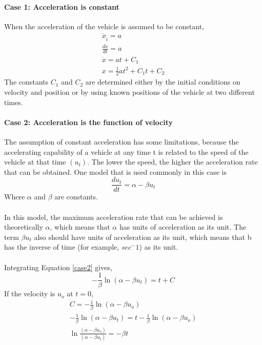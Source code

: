 \paragraph{Case 1: Acceleration is constant}
When the acceleration of the vehicle is assumed to be constant,
\begin{gather}
	\ddot{x}_{\hat{i}} = a\\
	\frac{d\dot{x}}{dt} = a\\
	\dot{x} = a t + C_1\\
	x =\frac{1}{2}a t^2 + C_1t+ C_2
\end{gather}
The constants $C_1$ and $C_2$ are determined either by the initial conditions on velocity and position or by using known positions of the vehicle at two different times.
\paragraph{Case 2: Acceleration is the function of velocity}
The assumption of constant acceleration has some limitations, because the accelerating capability of a vehicle at any time t is related to the speed of the vehicle at that time $(u_t)$. The lower the speed, the higher the acceleration rate that can be obtained. One model that is used commonly in this case is\\
\begin{equation}
	\label{case2}
	\frac{du_t}{dt} = \alpha - \beta u_t
\end{equation}
Where $\alpha$ and $\beta$ are constants.\\\\
In this model, the maximum acceleration rate that can be achieved is theoretically $\alpha$, which means that $\alpha$ has units of acceleration as its unit. The term $\beta u_t$ also should have units of acceleration as its unit, which means that b has the inverse of time (for example, $sec^-1$) as its unit.\\\\
Integrating Equation \ref{case2} gives,
\begin{equation*}
	-\frac{1}{\beta}\ln (\alpha - \beta u_t) = t + C
\end{equation*}
If the velocity is $u_o$ at $t = 0$,
\begin{gather*}
	C = -\frac{1}{\beta}\ln (\alpha - \beta u_o)\\
	-\frac{1}{\beta}\ln (\alpha - \beta u_t) = t  -\frac{1}{\beta}\ln (\alpha - \beta u_o)\\
	\ln\frac{(\alpha - \beta u_o)}{(\alpha - \beta u_t)} = -\beta t\\
\end{gather*}

